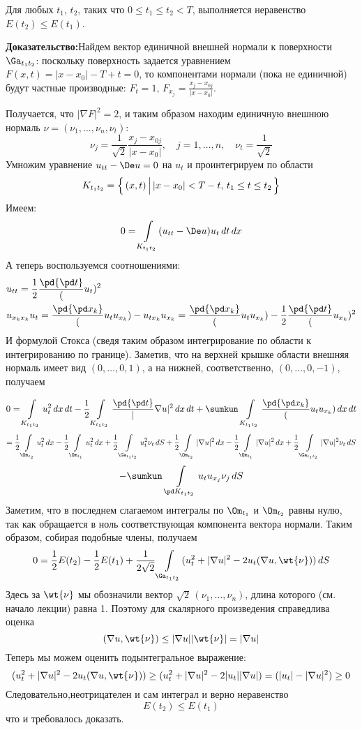 \documentclass[a4paper,draft]{article}
\begin{document}
\begin{theorem}
Для любых $t_1$, $t_2$, таких что $0\le t_1\le t_2 <T$,
выполняется неравенство $E(t_2)\le E(t_1)$.
\end{theorem}

\textbf{Доказательство:}Найдем вектор единичной внешней нормали к
поверхности $\Ga_{t_1 t_2}$: поскольку поверхность задается
уравнением $ F(x,t)=|x-x_0|-T+t=0 $, то компонентами нормали (пока
не единичной) будут частные производные:
$F_t=1,\,F_{x_j}=\frac{x_j-x_{0j}}{|x-x_0|}$.

Получается, что $|\nabla F|^2=2$, и таким образом находим
единичную внешнюю нормаль $\nu=(\nu_1,\ldots,\nu_n,\nu_t)$:
$$
\nu_j=\frac 1{\sqrt 2} \frac{x_j-x_{0j}}{|x-x_0|},\quad
j=1,\ldots,n,\quad \nu_t=\frac 1{\sqrt 2}
$$
Умножим уравнение $u_{tt}-\De u=0$ на $u_t$ и проинтегрируем по
области
$$
K_{t_1 t_2}=\left\{\,(x,t)\,\Bigl|\,|x-x_0|<T-t, \, t_1\le t\le
t_2\, \right\}
$$
Имеем:
$$
0=\int\limits_{K_{t_1 t_2}} (u_{tt}-\De u)u_t\,dt\,dx
$$
А теперь воспользуемся соотношениями:
\begin{align*}
&u_{tt}=\frac 12 \frac \pd{\pd t} (u_t)^2\\
&u_{x_k x_k}u_t=\frac \pd{\pd x_k} (u_t u_{x_k})-u_{t
x_k}u_{x_k}=\frac \pd{\pd x_k} (u_t u_{x_k})-\frac 12
\frac \pd{\pd t} (u_{x_k})^2
\end{align*}
И формулой Стокса (сведя таким образом интегрирование по области к
интегрированию по границе). Заметив, что на верхней крышке области
внешняя нормаль имеет вид $(0,\ldots,0,1)$, а на нижней,
соответственно, $(0,\ldots,0,-1)$, получаем

$$
0=\int\limits_{K_{t_1 t_2}} u_t^2\, dx\, dt -\frac
12\int\limits_{K_{t_1 t_2}} \frac
\pd{\pd t} |\nabla u|^2 \, dx\, dt + \sumkun
\,\int\limits_{K_{t_1 t_2}} \frac
\pd{\pd x_k} (u_t u_{x_k})\, dx\, dt
$$
$$
= \frac 12 \int\limits_{\Om_{t_2}} u_t^2\, dx - \frac 12
\int\limits_{\Om_{t_1}} u_t^2\, dx + \frac 12
\int\limits_{\Ga_{t_1 t_2}} u_t^2 \nu_t\, dS+\frac 12
\int\limits_{\Om_{t_2}} |\nabla u|^2\, dx - \frac 12
\int\limits_{\Om_{t_1}} |\nabla u|^2\, dx + \frac 12
\int\limits_{\Ga_{t_1 t_2}} |\nabla u|^2 \nu_t\, dS
$$
$$
-\sumkun  \,\int\limits_{\pd K_{t_1 t_2}} u_t u_{x_j}
\nu_j \, dS
$$
Заметим, что в последнем слагаемом интегралы по $\Om_{t_1}$ и
$\Om_{t_2}$ равны нулю, так как обращается в ноль
соответствующая компонента вектора нормали. Таким образом, собирая
подобные члены, получаем
$$
0=\frac 12 E(t_2)-\frac 12 E(t_1)+ \frac 1 {2\sqrt 2}
\int\limits_{\Ga_{t_1 t_2}} (u_t^2+|\nabla u|^2 - 2u_t(\nabla
u,\wt{\nu}))\,dS
$$
Здесь за $\wt{\nu}$ мы обозначили вектор  $\sqrt 2\,
(\nu_1,\ldots,\nu_n)$,  длина которого (см. начало лекции) равна
1. Поэтому для скалярного произведения справедлива оценка
$$
(\nabla u,\wt{\nu}) \le |\nabla u| |\wt{\nu}|=|\nabla u|
$$
Теперь мы можем оценить подынтегральное выражение:
$$
(u_t^2+|\nabla u|^2 - 2u_t(\nabla u,\wt{\nu}))\ge
(u_t^2+|\nabla u|^2 - 2|u_t| |\nabla u|)=(|u_t|-|\nabla u|^2)\ge 0
$$
Следовательно,неотрицателен и сам интеграл и верно неравенство
$$
E(t_2)\le E(t_1)
$$
что и требовалось доказать.
\end{document}

